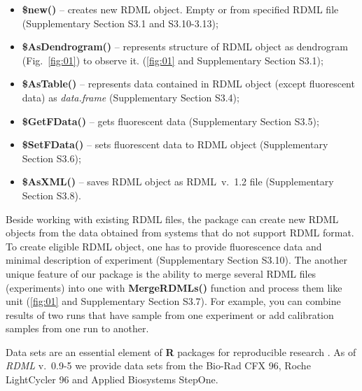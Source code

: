 \documentclass{bioinfo}
\begin{document}
\begin{itemize} 
  \item \textbf{\$new()} -- creates new RDML object. Empty or from specified RDML 
  file (Supplementary Section S3.1 and S3.10-3.13);
  \item \textbf{\$AsDendrogram()} -- represents 
  structure of RDML object as dendrogram (Fig.~\ref{fig:01}) to observe it. (\ref{fig:01} and Supplementary Section 
  S3.1);
  \item \textbf{\$AsTable()} -- represents data contained in RDML object (except 
  fluorescent data) as \textit{data.frame} (Supplementary Section S3.4);
  \item \textbf{\$GetFData()} -- gets fluorescent data (Supplementary Section S3.5);
  \item \textbf{\$SetFData()} -- sets fluorescent data to RDML object (Supplementary Section S3.6); 
  \item \textbf{\$AsXML()} -- saves RDML object as RDML~v.~1.2 file (Supplementary Section S3.8).
\end{itemize}
	
	Beside working with existing RDML files, the package can create new RDML 
objects from the data obtained from systems that do not support RDML format. To 
create eligible RDML object, one has to provide fluorescence data and minimal 
description of experiment (Supplementary Section S3.10). The another unique feature of our 
package is the ability to merge several RDML files (experiments) into one with 
\textbf{MergeRDMLs()} function and process them like unit (\ref{fig:01} and Supplementary Section 
S3.7). For example, you can combine results of two runs that have sample from one 
experiment or add calibration samples from one run to another.

Data sets are an essential element of \textbf{R} packages for reproducible 
research \cite{roediger2015r}. As of \textit{RDML} v.~0.9-5 we provide data sets 
from the Bio-Rad CFX 96, Roche LightCycler 96 and Applied Biosystems StepOne.
\end{document}
